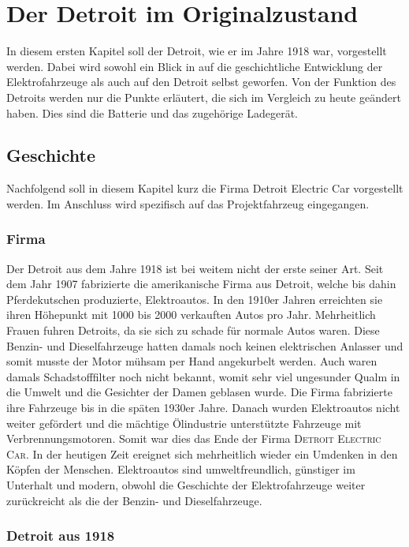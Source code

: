 \chapter{Der Detroit im Originalzustand}
In diesem ersten Kapitel soll der Detroit, wie er im Jahre 1918 war, vorgestellt werden. Dabei wird sowohl ein Blick in auf die geschichtliche Entwicklung der Elektrofahrzeuge als auch auf den Detroit selbst geworfen. Von der Funktion des Detroits werden nur die Punkte erläutert, die sich im Vergleich zu heute geändert haben. Dies sind die Batterie und das zugehörige Ladegerät.

\section{Geschichte}

Nachfolgend soll in diesem Kapitel kurz die Firma Detroit Electric Car vorgestellt werden. Im Anschluss wird spezifisch auf das Projektfahrzeug eingegangen.

\subsection{Firma}

Der Detroit aus dem Jahre 1918 ist bei weitem nicht der erste seiner Art. Seit dem Jahr 1907 fabrizierte die amerikanische Firma aus Detroit, welche bis dahin Pferdekutschen produzierte, Elektroautos. In den 1910er Jahren erreichten sie ihren Höhepunkt mit 1000 bis 2000 verkauften Autos pro Jahr. Mehrheitlich Frauen fuhren Detroits, da sie sich zu schade für normale Autos waren. Diese Benzin- und Dieselfahrzeuge hatten damals noch keinen elektrischen Anlasser und somit musste der Motor mühsam per Hand angekurbelt werden. Auch waren damals Schadstofffilter noch nicht bekannt, womit sehr viel ungesunder Qualm in die Umwelt und die Gesichter der Damen geblasen wurde. Die Firma fabrizierte ihre Fahrzeuge bis in die späten 1930er Jahre. Danach wurden Elektroautos nicht weiter gefördert und die mächtige Ölindustrie unterstützte Fahrzeuge mit Verbrennungsmotoren. Somit war dies das Ende der Firma \textsc{Detroit Electric Car}.
In der heutigen Zeit ereignet sich mehrheitlich wieder ein Umdenken in den Köpfen der Menschen. Elektroautos sind umweltfreundlich, günstiger im Unterhalt und modern, obwohl die Geschichte der Elektrofahrzeuge weiter zurückreicht als die der Benzin- und Dieselfahrzeuge.

\subsection{Detroit aus 1918}

